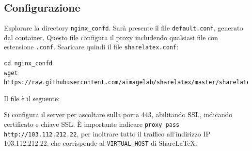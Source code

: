 \subsection{Configurazione}
Esplorare la directory \verb|nginx_confd|. Sarà presente il file \verb|default.conf|, generato dal container. Questo file configura il proxy includendo qualsiasi file con estensione \verb|.conf|. Scaricare quindi il file \verb|sharelatex.conf|:
\begin{lstlisting}
cd nginx_confd
wget https://raw.githubusercontent.com/aimagelab/sharelatex/master/sharelatex.conf
\end{lstlisting}
Il file è il seguente:

Si configura il server per ascoltare sulla porta 443, abilitando SSL, indicando certificato e chiave SSL. È importante indicare \verb|proxy_pass http://103.112.212.22|, per inoltrare tutto il traffico all'indirizzo IP 103.112.212.22, che corrisponde al \verb|VIRTUAL_HOST| di ShareLaTeX.